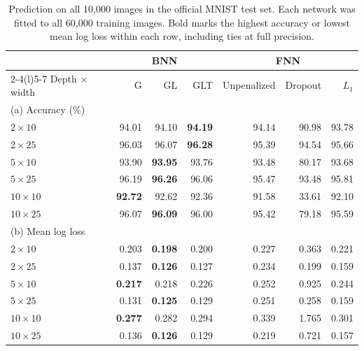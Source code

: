 \begin{table}[htbp]
\centering\small
\caption{Prediction on all 10,000 images in the official MNIST test set. Each network was fitted to all 60,000 training images. Bold marks the highest accuracy or lowest mean log loss within each row, including ties at full precision.}\label{tab:mnist-results}
\begin{tabular}{@{}lrrrrrr@{}}\toprule
& \multicolumn{3}{c}{BNN} & \multicolumn{3}{c}{FNN} \\
\cmidrule(lr){2-4}\cmidrule(l){5-7}
Depth $\times$ width & G & GL & GLT & Unpenalized & Dropout & $L_1$ \\
\midrule
\multicolumn{7}{l}{(a) Accuracy (\%)} \\
$2\times 10$ & 94.01 & 94.10 & \textbf{94.19} & 94.14 & 90.98 & 93.78 \\
$2\times 25$ & 96.03 & 96.07 & \textbf{96.28} & 95.39 & 94.54 & 95.66 \\
$5\times 10$ & 93.90 & \textbf{93.95} & 93.76 & 93.48 & 80.17 & 93.68 \\
$5\times 25$ & 96.19 & \textbf{96.26} & 96.06 & 95.47 & 93.48 & 95.81 \\
$10\times 10$ & \textbf{92.72} & 92.62 & 92.36 & 91.58 & 33.61 & 92.10 \\
$10\times 25$ & 96.07 & \textbf{96.09} & 96.00 & 95.42 & 79.18 & 95.59 \\
\midrule
\multicolumn{7}{l}{(b) Mean log loss} \\
$2\times 10$ & 0.203 & \textbf{0.198} & 0.200 & 0.227 & 0.363 & 0.221 \\
$2\times 25$ & 0.137 & \textbf{0.126} & 0.127 & 0.234 & 0.199 & 0.159 \\
$5\times 10$ & \textbf{0.217} & 0.218 & 0.226 & 0.252 & 0.925 & 0.244 \\
$5\times 25$ & 0.131 & \textbf{0.125} & 0.129 & 0.251 & 0.258 & 0.159 \\
$10\times 10$ & \textbf{0.277} & 0.282 & 0.294 & 0.339 & 1.765 & 0.301 \\
$10\times 25$ & 0.136 & \textbf{0.126} & 0.129 & 0.219 & 0.721 & 0.157 \\
\bottomrule\end{tabular}
\end{table}
